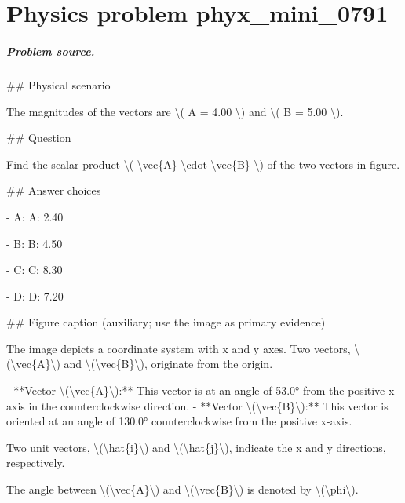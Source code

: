 
\chapter{Physics problem phyx\_mini\_0791}
\label{ch:PhyXMiniProblems_problem_phyx_mini_0791}

\paragraph{Problem source.}
\#\# Physical scenario

The magnitudes of the vectors are \textbackslash{}( A = 4.00 \textbackslash{}) and \textbackslash{}( B = 5.00 \textbackslash{}).

\#\# Question

Find the scalar product \textbackslash{}( \textbackslash{}vec\{A\} \textbackslash{}cdot \textbackslash{}vec\{B\} \textbackslash{}) of the two vectors in figure.

\#\# Answer choices

- A: A: 2.40

- B: B: 4.50

- C: C: 8.30

- D: D: 7.20

\#\# Figure caption (auxiliary; use the image as primary evidence)

The image depicts a coordinate system with x and y axes. Two vectors, \textbackslash{}(\textbackslash{}vec\{A\}\textbackslash{}) and \textbackslash{}(\textbackslash{}vec\{B\}\textbackslash{}), originate from the origin. 

- **Vector \textbackslash{}(\textbackslash{}vec\{A\}\textbackslash{}):** This vector is at an angle of 53.0° from the positive x-axis in the counterclockwise direction.
- **Vector \textbackslash{}(\textbackslash{}vec\{B\}\textbackslash{}):** This vector is oriented at an angle of 130.0° counterclockwise from the positive x-axis.
  
Two unit vectors, \textbackslash{}(\textbackslash{}hat\{i\}\textbackslash{}) and \textbackslash{}(\textbackslash{}hat\{j\}\textbackslash{}), indicate the x and y directions, respectively.

The angle between \textbackslash{}(\textbackslash{}vec\{A\}\textbackslash{}) and \textbackslash{}(\textbackslash{}vec\{B\}\textbackslash{}) is denoted by \textbackslash{}(\textbackslash{}phi\textbackslash{}).

